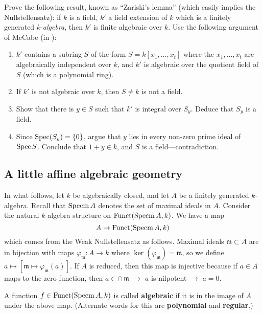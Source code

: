 \begin{exercise} 
Prove the following result, known as ``Zariski's lemma'' (which easily implies
the Nullstellensatz): if $k$ is a field, $k'$ a field extension of $k$ which
is a finitely generated $k$-\emph{algebra}, then $k'$ is finite algebraic over
$k$. Use the following argument of McCabe (in \cite{Mc76}):
\begin{enumerate}
\item $k'$ contains a subring $S$ of the form $S= k[ x_1, \dots, x_t]$ where
the $x_1, \dots, x_t$ are algebraically independent over $k$, and $k'$ is
algebraic over the quotient field of $S$ (which is a polynomial ring). 
\item  If $k'$ is not algebraic over $k$, then $S \neq k$ is not a field.
\item Show that there is $y \in S$ such that $k'$ is integral over $S_y$.
Deduce that $S_y$ is a field.
\item Since $\operatorname{Spec} (S_y) = \left\{0\right\}$, argue that $y$ lies in every
non-zero prime ideal of $\operatorname{Spec} S$. Conclude that $1+y \in k$, and $S$ is a
field---contradiction.
\end{enumerate}
\end{exercise} 

\subsection{A little affine algebraic geometry}

In what follows, let $k$ be algebraically closed, and let $A$ be a finitely generated $k$-algebra.  Recall that $\operatorname{Specm} A$ denotes the set of maximal ideals in $A$.  Consider the natural $k$-algebra structure on $\mathrm{Funct}(\operatorname{Specm} A, k)$.  We have a map
$$A \rightarrow \mathrm{Funct}(\operatorname{Specm} A, k)$$
which comes from the Weak Nullstellensatz as follows.  Maximal ideals $\mathfrak{m}\subset A$ are in bijection with maps $\varphi_\mathfrak{m}:A\rightarrow k$ where $\ker(\varphi_\mathfrak{m})=\mathfrak{m}$, so we define $a\longmapsto [\mathfrak{m}\longmapsto \varphi_\mathfrak{m}(a)]$.  If $A$ is reduced, then this map is injective because if $a\in A$ maps to the zero function, then $a\in \cap\, \mathfrak{m}$ $\rightarrow$ $a$ is nilpotent $\rightarrow$ $a=0$.\\

\begin{definition} A function $f\in \mathrm{Funct}(\operatorname{Specm} A,k)$ is called {\bf algebraic} if it is in the image of $A$ under the above map.  (Alternate words for this are {\bf polynomial} and {\bf regular}.) \end{definition}

